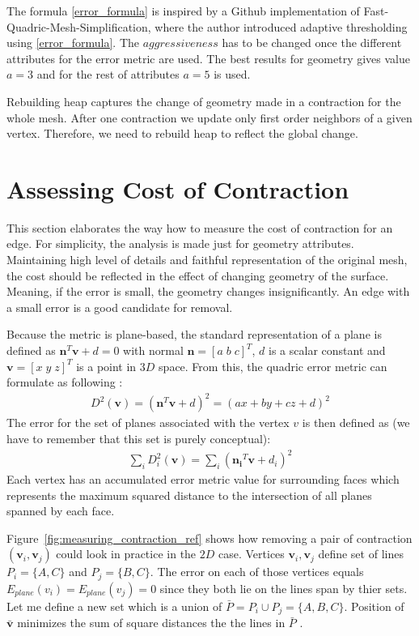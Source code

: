 The formula \ref{error_formula} is inspired by a Github implementation of Fast-Quadric-Mesh-Simplification, where the author introduced adaptive thresholding using \ref{error_formula}. The $aggressiveness$ has to be changed once the different attributes for the error metric are used. The best results for geometry gives value $a=3$ and for the rest of attributes $a=5$ is used.

Rebuilding heap captures the change of geometry made in a contraction for the whole mesh. After one contraction we update only first order neighbors of a given vertex. Therefore, we need to rebuild heap to reflect the global change.

\section{Assessing Cost of Contraction}
This section elaborates the way how to measure the cost of contraction for an edge. For simplicity, the analysis is made just for geometry attributes. Maintaining high level of details and faithful representation of the original mesh, the cost should be reflected in the effect of changing geometry of the surface. Meaning, if the error is small, the geometry changes insignificantly. An edge with a small error is a good candidate for removal.

Because the metric is plane-based, the standard representation of a plane is defined as $\mathbf{n}^T\mathbf{v}+d=0$ with normal  $\mathbf{n} = [a\;b\;c]^T$, $d$ is a scalar constant and $\mathbf{v} = [x\;y\;z]^T$ is a point in $3D$ space. From this, the quadric error metric can formulate as following \cite{garland99}:
\begin{align}
D^2(\mathbf{v}) = (\mathbf{n}^T\mathbf{v}+d)^2 = (ax + by + cz + d)^2
\label{quadric_distance}
\end{align}
The error for the set of planes associated with the vertex $v$ is then defined as (we have to remember that this set is purely conceptual):
\begin{align}
\sum_{i} D_i^2(\mathbf{v}) = \sum_{i} (\mathbf{n_i}^T\mathbf{v}+d_i)^2
\end{align}
Each vertex has an accumulated error metric value for surrounding faces which represents the maximum squared distance to the intersection of all planes spanned by each face.

Figure~\ref{fig:measuring_contraction_ref} shows how removing a pair of contraction $(\mathbf{v}_i, \mathbf{v}_j)$ could look in practice in the $2D$ case. Vertices $\mathbf{v}_i, \mathbf{v}_j$ define set of lines $P_i = \{A,C\}$ and $P_j = \{B, C\}$. The error on each of those vertices equals $E_{plane}(v_i) = E_{plane}(v_j) = 0$ since they both lie on the lines span by thier sets. Let me define a new set which is a union of $ \bar{P} = P_i \cup P_j = \{ A,B,C \}$. Position of $\bar{\mathbf{v}}$ minimizes the sum of square distances the the lines in $\bar{P}$ \cite{garland99}.

